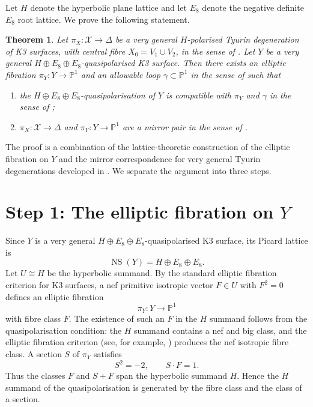 \documentclass{article}
\theoremstyle{plain}
\newtheorem{theorem}{Theorem}
\begin{document}
Let $H$ denote the hyperbolic plane lattice and let $E_8$ denote the negative definite $E_8$ root lattice. We prove the following statement.

\begin{theorem}
Let $\pi_X\colon \mathcal X\to \Delta$ be a very general $H$-polarised Tyurin degeneration of K3 surfaces, with central fibre $X_0=V_1\cup V_2$, in the sense of \cite[Definition 3.20]{dfk3slpms}. Let $Y$ be a very general $H\oplus E_8\oplus E_8$-quasipolarised K3 surface. Then there exists an elliptic fibration $\pi_Y\colon Y\to \mathbb P^1$ and an allowable loop $\gamma\subset \mathbb P^1$ in the sense of \cite[Definition 4.11]{dfk3slpms} such that
\begin{enumerate}
\item the $H\oplus E_8\oplus E_8$-quasipolarisation of $Y$ is compatible with $\pi_Y$ and $\gamma$ in the sense of \cite[Definition 4.21]{dfk3slpms};
\item $\pi_X\colon \mathcal X\to \Delta$ and $\pi_Y\colon Y\to \mathbb P^1$ are a mirror pair in the sense of \cite[Definition 5.1]{dfk3slpms}.
\end{enumerate}
\end{theorem}

The proof is a combination of the lattice-theoretic construction of the elliptic fibration on $Y$ and the mirror correspondence for very general Tyurin degenerations developed in \cite{dfk3slpms}. We separate the argument into three steps.

\section*{Step 1: The elliptic fibration on $Y$}

Since $Y$ is a very general $H\oplus E_8\oplus E_8$-quasipolarised K3 surface, its Picard lattice is
\[
\operatorname{NS}(Y)=H\oplus E_8\oplus E_8.
\]
Let $U\cong H$ be the hyperbolic summand. By the standard elliptic fibration criterion for K3 surfaces, a nef primitive isotropic vector $F\in U$ with $F^2=0$ defines an elliptic fibration
\[
\pi_Y\colon Y\longrightarrow \mathbb P^1
\]
with fibre class $F$. The existence of such an $F$ in the $H$ summand follows from the quasipolarisation condition: the $H$ summand contains a nef and big class, and the elliptic fibration criterion (see, for example, \cite[Lemma 4.2]{dfk3slpms}) produces the nef isotropic fibre class. A section $S$ of $\pi_Y$ satisfies
\[
S^2=-2,\qquad S\cdot F=1.
\]
Thus the classes $F$ and $S+F$ span the hyperbolic summand $H$. Hence the $H$ summand of the quasipolarisation is generated by the fibre class and the class of a section.
\end{document}
